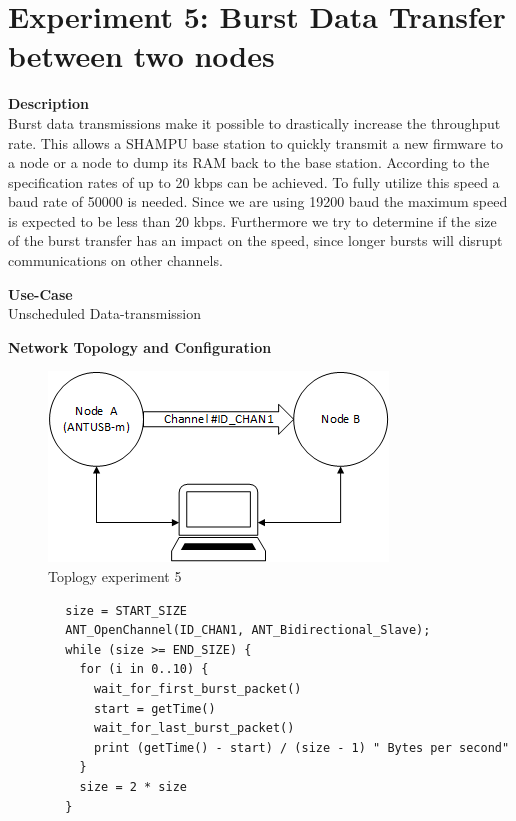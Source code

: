 \section{Experiment 5: Burst Data Transfer between two nodes}
\begin{description} 
	\item{\textbf{Description}} \hfill \\ Burst data transmissions make it possible to drastically increase the throughput rate. This allows a SHAMPU base station to quickly transmit a new firmware to a node or a node to dump its RAM back to the base station.	According to the  specification rates of up to 20 kbps can be achieved. To fully utilize this speed a baud rate of 50000 is needed. Since we are using 19200 baud the maximum speed is expected to be less than 20 kbps. Furthermore we try to determine if the size of the burst transfer has an impact on the speed, since longer bursts will disrupt communications on other channels.
	\item{\textbf{Use-Case}} \hfill \\ Unscheduled Data-transmission
	\item{\textbf{Network Topology and Configuration}} \hfill \\ 
	\begin{figure}[H]
		\centering
		\includegraphics[scale=1]{./pics/exp5_topo.png}
		\caption{Toplogy experiment 5}
	\end{figure}
	\begin{code}[H]
		\begin{verbatim}
		size = START_SIZE
		ANT_OpenChannel(ID_CHAN1, ANT_Bidirectional_Slave);		
		while (size >= END_SIZE) {
		  for (i in 0..10) {
		    wait_for_first_burst_packet()
		    start = getTime()
		    wait_for_last_burst_packet()
		    print (getTime() - start) / (size - 1) " Bytes per second"
		  }
		  size = 2 * size
		}
		\end{verbatim}
		\caption{Burst data transfer (Slave)}\label{lst:sExp5}
	\end{code}

\end{description}
